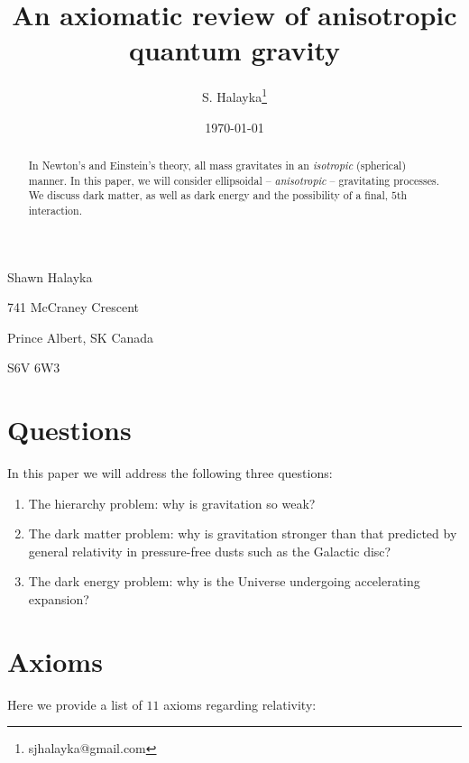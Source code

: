 \documentclass[12pt]{article}
\title{An axiomatic review of anisotropic quantum gravity}
\author{S. Halayka\footnote{sjhalayka@gmail.com}}
\date{\today\;\currenttime}
\begin{document}
 
\maketitle



Shawn Halayka

741 McCraney Crescent

Prince Albert, SK Canada

S6V 6W3



\begin{abstract}
In Newton's and Einstein's theory, all mass gravitates in an {\textit{isotropic}} (spherical) manner.
In this paper, we will consider ellipsoidal -- {\textit{anisotropic}} -- gravitating processes.
We discuss dark matter, as well as dark energy and the possibility of a final, $5$th interaction.
\end{abstract}


\section{Questions}

In this paper we will address the following three questions:
\begin{enumerate}
\item The hierarchy problem: why is gravitation so weak?
\item The dark matter problem: why is gravitation stronger than that predicted by general relativity in pressure-free dusts such as the Galactic disc?
\item The dark energy problem: why is the Universe undergoing accelerating expansion?
\end{enumerate}






\section{Axioms}

Here we provide a list of $11$ axioms regarding relativity:
\end{document}
